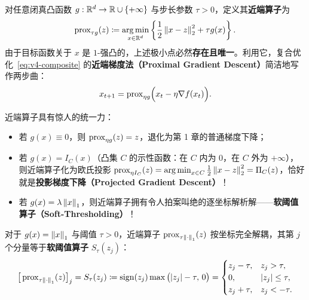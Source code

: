 \begin{defBox}
\begin{definition}[近端算子与近端梯度法]\label{def:v4-prox}
对任意闭真凸函数 $g: \mathbb{R}^d \to \mathbb{R} \cup \{+\infty\}$ 与步长参数 $\tau > 0$，定义其\textbf{近端算子}为
\begin{equation}\label{eq:v4-prox-def}
  \operatorname{prox}_{\tau g}(z) \coloneqq \operatorname*{arg\,min}_{x \in \mathbb{R}^d} \left\{ \frac{1}{2}\left\|x - z\right\|_2^2 + \tau g(x) \right\}.
\end{equation}
由于目标函数关于 $x$ 是 $1$-强凸的，上述极小点必然\textbf{存在且唯一}。利用它，复合优化~\eqref{eq:v4-composite} 的\textbf{近端梯度法（Proximal Gradient Descent）}简洁地写作两步曲：
\begin{equation}\label{eq:v4-pgd}
  x_{t+1} = \operatorname{prox}_{\eta g}\!\Big(x_t - \eta \nabla f(x_t)\Big).
\end{equation}
\end{definition}
\end{defBox}

近端算子具有惊人的统一力：
\begin{itemize}
  \item 若 $g(x) \equiv 0$，则 $\operatorname{prox}_{\eta g}(z) = z$，退化为第 1 章的普通梯度下降；
  \item 若 $g(x) = I_C(x)$（凸集 $C$ 的示性函数：在 $C$ 内为 $0$，在 $C$ 外为 $+\infty$），则近端算子化为欧氏投影 $\operatorname{prox}_{\eta I_C}(z) = \operatorname*{arg\,min}_{x\in C}\frac{1}{2}\left\|x-z\right\|_2^2 = \Pi_C(z)$，恰好就是\textbf{投影梯度下降（Projected Gradient Descent）}！
  \item 若 $g(x) = \lambda \left\|x\right\|_1$，则近端算子拥有令人拍案叫绝的逐坐标解析解——\textbf{软阈值算子（Soft-Thresholding）}！
\end{itemize}

\begin{thmBox}
\begin{theorem}\label{thm:v4-soft-thresh}
对于 $g(x) = \left\|x\right\|_1$ 与阈值 $\tau > 0$，近端算子 $\operatorname{prox}_{\tau\left\|\cdot\right\|_1}(z)$ 按坐标完全解耦，其第 $j$ 个分量等于\textbf{软阈值算子} $S_\tau(z_j)$：
\begin{equation}\label{eq:v4-soft-thresh}
  \big[\operatorname{prox}_{\tau\left\|\cdot\right\|_1}(z)\big]_j = S_\tau(z_j) \coloneqq \operatorname{sign}(z_j)\max\big(|z_j| - \tau,\, 0\big) =
  \begin{cases}
    z_j - \tau, & z_j > \tau, \\
    0, & |z_j| \le \tau, \\
    z_j + \tau, & z_j < -\tau.
  \end{cases}
\end{equation}
\end{theorem}
\end{thmBox}

